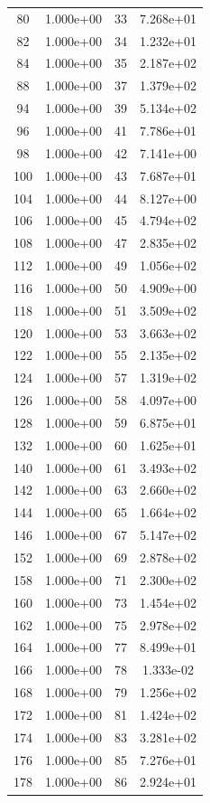 \documentclass[12pt]{article}
\begin{document}
\begin{longtable}{@{}cccc@{}}
80 & 1.000e+00 & 33 & 7.268e+01 \\
82 & 1.000e+00 & 34 & 1.232e+01 \\
84 & 1.000e+00 & 35 & 2.187e+02 \\
88 & 1.000e+00 & 37 & 1.379e+02 \\
94 & 1.000e+00 & 39 & 5.134e+02 \\
96 & 1.000e+00 & 41 & 7.786e+01 \\
98 & 1.000e+00 & 42 & 7.141e+00 \\
100 & 1.000e+00 & 43 & 7.687e+01 \\
104 & 1.000e+00 & 44 & 8.127e+00 \\
106 & 1.000e+00 & 45 & 4.794e+02 \\
108 & 1.000e+00 & 47 & 2.835e+02 \\
112 & 1.000e+00 & 49 & 1.056e+02 \\
116 & 1.000e+00 & 50 & 4.909e+00 \\
118 & 1.000e+00 & 51 & 3.509e+02 \\
120 & 1.000e+00 & 53 & 3.663e+02 \\
122 & 1.000e+00 & 55 & 2.135e+02 \\
124 & 1.000e+00 & 57 & 1.319e+02 \\
126 & 1.000e+00 & 58 & 4.097e+00 \\
128 & 1.000e+00 & 59 & 6.875e+01 \\
132 & 1.000e+00 & 60 & 1.625e+01 \\
140 & 1.000e+00 & 61 & 3.493e+02 \\
142 & 1.000e+00 & 63 & 2.660e+02 \\
144 & 1.000e+00 & 65 & 1.664e+02 \\
146 & 1.000e+00 & 67 & 5.147e+02 \\
152 & 1.000e+00 & 69 & 2.878e+02 \\
158 & 1.000e+00 & 71 & 2.300e+02 \\
160 & 1.000e+00 & 73 & 1.454e+02 \\
162 & 1.000e+00 & 75 & 2.978e+02 \\
164 & 1.000e+00 & 77 & 8.499e+01 \\
166 & 1.000e+00 & 78 & 1.333e-02 \\
168 & 1.000e+00 & 79 & 1.256e+02 \\
172 & 1.000e+00 & 81 & 1.424e+02 \\
174 & 1.000e+00 & 83 & 3.281e+02 \\
176 & 1.000e+00 & 85 & 7.276e+01 \\
178 & 1.000e+00 & 86 & 2.924e+01 \\

\end{longtable}
\end{document}
